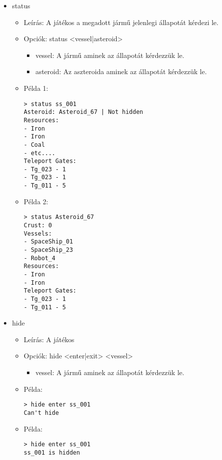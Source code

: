 \documentclass[../../projlab]{subfiles}
\begin{document}
\begin{itemize}
    \item status
    \begin{itemize}
        \item Leírás: A játékos a megadott jármű jelenlegi állapotát kérdezi le.
        \item Opciók: status <vessel|asteroid>
        \begin{itemize}
            \item vessel: A jármű aminek az állapotát kérdezzük le.
            \item asteroid: Az aszteroida aminek az állapotát kérdezzük le.
        \end{itemize}
        \item Példa 1:
            \begin{verbatim}
> status ss_001
Asteroid: Asteroid_67 | Not hidden
Resources:
- Iron
- Iron
- Coal
- etc....
Teleport Gates:
- Tg_023 - 1
- Tg_023 - 1
- Tg_011 - 5
            \end{verbatim}
        \item Példa 2:
            \begin{verbatim}
> status Asteroid_67
Crust: 0
Vessels:
- SpaceShip_01
- SpaceShip_23
- Robot_4
Resources:
- Iron
- Iron
Teleport Gates:
- Tg_023 - 1
- Tg_011 - 5
            \end{verbatim}        
    \end{itemize}


    \item hide
    \begin{itemize}
        \item Leírás: A játékos 
        \item Opciók: hide <enter|exit> <vessel>
        \begin{itemize}
            \item vessel: A jármű aminek az állapotát kérdezzük le.
        \end{itemize}
        \item Példa:
            \begin{verbatim}
> hide enter ss_001
Can't hide
            \end{verbatim}
        \item Példa:
            \begin{verbatim}
> hide enter ss_001
ss_001 is hidden
            \end{verbatim}            
    \end{itemize}



\end{itemize}
\end{document}
